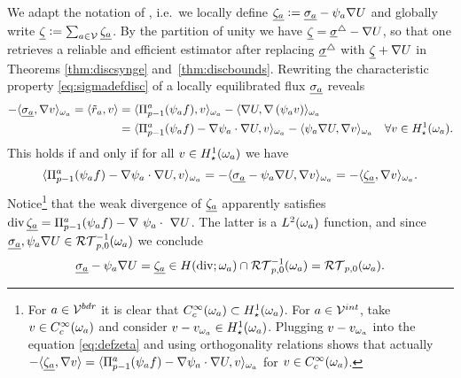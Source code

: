 \documentclass[thesis.tex]{subfiles}
\begin{document}
We adapt the notation of \cite{ernequil}, i.e.~we locally define $\underline{\zeta_a} := \underline{\sigma_a} - \psi_a \nabla U$ 
and globally write $\underline{\zeta} := \sum_{a \in \mathcal{V}} \underline{\zeta_a}$.
By the partition of unity we have 
$ \underline{\zeta} = \underline{\sigma}^\triangle - \nabla U$, so that one retrieves a reliable and efficient estimator after replacing $\underline{\sigma}^\triangle$ with $\underline{\zeta} + \nabla U$ in Theorems \ref{thm:discsynge} and~\ref{thm:discbounds}. Rewriting the characteristic property \eqref{eq:sigmadefdisc} of a locally equilibrated flux $\underline{\sigma_a}$ reveals
\begin{align*}
  -\langle \underline{\sigma_a}, \nabla v \rangle_{\omega_a}  = \langle \tilde r_a, v \rangle &=  \langle \Pi_{p-1}^a(\psi_a f), v \rangle_{\omega_a} - \langle \nabla U, \nabla \left(\psi_a v\right) \rangle_{\omega_a} \\
  &=  \langle \Pi_{p-1}^a(\psi_a f) - \nabla \psi_a \cdot \nabla U, v \rangle_{\omega_a} - \langle \psi_a \nabla U, \nabla v \rangle_{\omega_a} \quad \forall v \in H_\star^1(\omega_a).
\end{align*}
This holds if and only if for all $v \in H_\star^1(\omega_a)$ we have 
\begin{equation}
  \label{eq:defzeta}
  \langle \Pi_{p-1}^a(\psi_a f) - \nabla \psi_a \cdot \nabla U, v \rangle_{\omega_a} = - \langle \underline{\sigma_a} - \psi_a \nabla U, \nabla v \rangle_{\omega_a} = - \langle \underline{\zeta_a}, \nabla v \rangle_{\omega_a}.
\end{equation}
Notice\footnote{
For $a\in \mathcal{V}^{bdr}$ it is clear that $C_c^{\infty}(\omega_a) \subset H_\star^1(\omega_a)$. For $a \in \mathcal{V}^{int}$, take $v \in C_c^{\infty}(\omega_a)$ and consider $v - v_{\omega_a} \in H_\star^1(\omega_a)$. Plugging $v - v_{\omega_a}$ into the equation \eqref{eq:defzeta} and using orthogonality relations shows that actually $ - \langle \underline{\zeta_a}, \nabla v \rangle = \langle \Pi_{p-1}^a(\psi_a f) - \nabla \psi_a \cdot \nabla U, v \rangle_{\omega_a}$ for $v \in C_c^{\infty}(\omega_a)$.}
that the weak divergence of $\underline{\zeta_a}$ apparently satisfies  $\operatorname{div} \underline{\zeta_a} = \Pi_{p-1}^a(\psi_a f) - \nabla~\psi_a\cdot~\nabla U$.
The latter is a $L^2(\omega_a)$ function, and since
 $\underline{\sigma_a},\psi_a\nabla U \in \mathcal{RT}_{p,0}^{-1}(\omega_a)$ we conclude
\[
 \underline{\sigma_a} - \psi_a \nabla U  = \underline{\zeta_a} \in H(\operatorname{div}; \omega_a) \cap \mathcal{RT}_{p,0}^{-1}(\omega_a) = \mathcal{RT}_{p,0}(\omega_a).
\]
\end{document}
